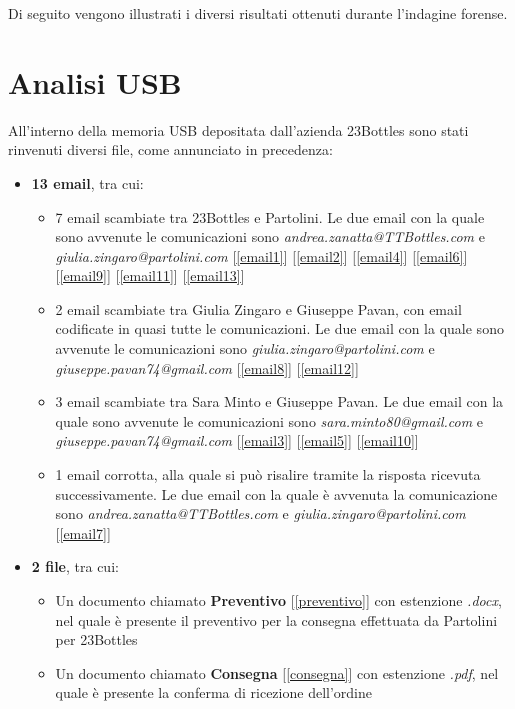 Di seguito vengono illustrati i diversi risultati ottenuti durante l'indagine forense.
\section{Analisi USB}
All'interno della memoria USB depositata dall'azienda 23Bottles sono stati rinvenuti diversi file, come annunciato in precedenza:
\begin{itemize}
    \item \textbf{13 email}, tra cui:
        \begin{itemize}
            \item 7 email scambiate tra 23Bottles e Partolini. Le due email con la quale sono avvenute le comunicazioni sono \textit{andrea.zanatta@TTBottles.com} e \\ \textit{giulia.zingaro@partolini.com} [\ref{email1}] [\ref{email2}] [\ref{email4}] [\ref{email6}] [\ref{email9}] [\ref{email11}] [\ref{email13}]
            \item 2 email scambiate tra Giulia Zingaro e Giuseppe Pavan, con email codificate in quasi tutte le comunicazioni. Le due email con la quale sono avvenute le comunicazioni sono \textit{giulia.zingaro@partolini.com} e \textit{giuseppe.pavan74@gmail.com} [\ref{email8}] [\ref{email12}]
            \item 3 email scambiate tra Sara Minto e Giuseppe Pavan. Le due email con la quale sono avvenute le comunicazioni sono \textit{sara.minto80@gmail.com} e \\ \textit{giuseppe.pavan74@gmail.com} [\ref{email3}] [\ref{email5}] [\ref{email10}]
            \item 1 email corrotta, alla quale si può risalire tramite la risposta ricevuta successivamente. Le due email con la quale è avvenuta la comunicazione sono \textit{andrea.zanatta@TTBottles.com} e \textit{giulia.zingaro@partolini.com} [\ref{email7}]
        \end{itemize} 
    \item \textbf{2 file}, tra cui:
        \begin{itemize}
            \item Un documento chiamato \textbf{Preventivo} [\ref{preventivo}] con estenzione \textit{.docx}, nel quale è presente il preventivo per la consegna effettuata da Partolini per 23Bottles
            \item Un documento chiamato \textbf{Consegna} [\ref{consegna}] con estenzione \textit{.pdf}, nel quale è presente la conferma di ricezione dell'ordine
        \end{itemize}
\end{itemize}

